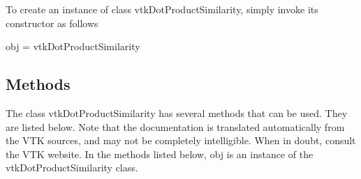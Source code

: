 To create an instance of class vtk\-Dot\-Product\-Similarity, simply invoke its constructor as follows \begin{DoxyVerb}  obj = vtkDotProductSimilarity
\end{DoxyVerb}
 \hypertarget{vtkwidgets_vtkxyplotwidget_Methods}{}\subsection{Methods}\label{vtkwidgets_vtkxyplotwidget_Methods}
The class vtk\-Dot\-Product\-Similarity has several methods that can be used. They are listed below. Note that the documentation is translated automatically from the V\-T\-K sources, and may not be completely intelligible. When in doubt, consult the V\-T\-K website. In the methods listed below, {\ttfamily obj} is an instance of the vtk\-Dot\-Product\-Similarity class. 
